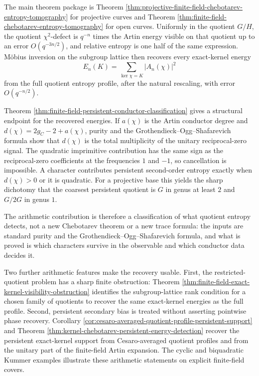 The main theorem package is Theorem \ref{thm:projective-finite-field-chebotarev-entropy-tomography} for projective curves and Theorem \ref{thm:finite-field-chebotarev-entropy-tomography} for open curves.  Uniformly in the quotient \(G/H\), the quotient \(\chi^2\)-defect is \(q^{-n}\) times the Artin energy visible on that quotient up to an error \(O(q^{-3n/2})\), and relative entropy is one half of the same expression.  M\"obius inversion on the subgroup lattice then recovers every exact-kernel energy
\[
E_n(K)=\sum_{\ker\chi=K}|A_n(\chi)|^2
\]
from the full quotient entropy profile, after the natural rescaling, with error \(O(q^{-n/2})\).

Theorem \ref{thm:finite-field-persistent-conductor-classification} gives a structural endpoint for the recovered energies.  If \(a(\chi)\) is the Artin conductor degree and \(d(\chi)=2g_C-2+a(\chi)\), purity and the Grothendieck--Ogg--Shafarevich formula show that \(d(\chi)\) is the total multiplicity of the unitary reciprocal-zero signal.  The quadratic imprimitive contribution has the same sign as the reciprocal-zero coefficients at the frequencies \(1\) and \(-1\), so cancellation is impossible.  A character contributes persistent second-order entropy exactly when \(d(\chi)>0\) or it is quadratic.  For a projective base this yields the sharp dichotomy that the coarsest persistent quotient is \(G\) in genus at least \(2\) and \(G/2G\) in genus \(1\).

The arithmetic contribution is therefore a classification of what quotient entropy
detects, not a new Chebotarev theorem or a new trace formula: the inputs are
standard purity and the Grothendieck--Ogg--Shafarevich formula, and what is proved
is which characters survive in the observable and which conductor data decides it.

Two further arithmetic features make the recovery usable.  First, the restricted-quotient problem has a sharp finite obstruction: Theorem \ref{thm:finite-field-exact-kernel-visibility-obstruction} identifies the subgroup-lattice rank condition for a chosen family of quotients to recover the same exact-kernel energies as the full profile.  Second, persistent secondary bias is treated without asserting pointwise phase recovery.  Corollary \ref{cor:cesaro-averaged-quotient-profile-persistent-support} and Theorem \ref{thm:kernel-chebotarev-persistent-energy-detection} recover the persistent exact-kernel support from Cesaro-averaged quotient profiles and from the unitary part of the finite-field Artin expansion.  The cyclic and biquadratic Kummer examples illustrate these arithmetic statements on explicit finite-field covers.

